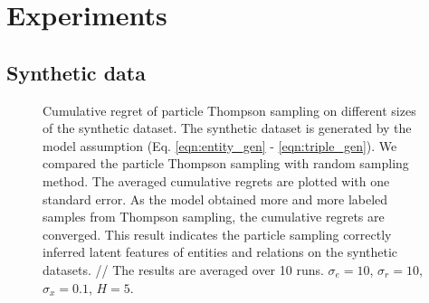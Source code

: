 \section{Experiments}
\subsection{Synthetic data}
\begin{figure}[t]
	\centering
	
	\caption{\label{fig:synthetic} Cumulative regret of particle Thompson sampling on different sizes of the synthetic dataset. The synthetic dataset is generated by the model assumption (Eq. \ref{eqn:entity_gen} - \ref{eqn:triple_gen}). We compared the particle Thompson sampling with random sampling method. The averaged cumulative regrets are plotted with one standard error. As the model obtained more and more labeled samples from Thompson sampling, the cumulative regrets are converged. This result  indicates the particle sampling correctly inferred latent features of entities and relations on the synthetic datasets. // The results are averaged over 10 runs. $\sigma_e = 10$, $\sigma_r=10$, $\sigma_x=0.1$, $H=5$.}
\end{figure}

